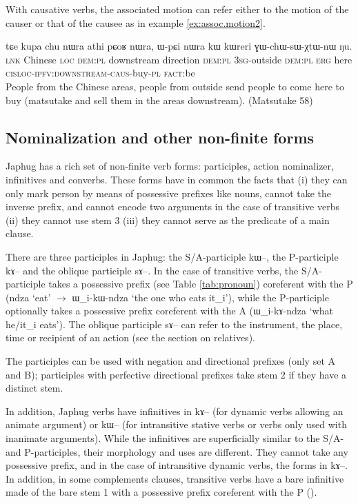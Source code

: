 \documentclass[oldfontcommands,oneside,a4paper,11pt]{article}
\newcommand{\ipa}[1]{{\phon #1}} %
\begin{document}
With causative verbs, the associated motion can refer either to the motion of the causer or that of the causee as in example \ref{ex:assoc.motion2}.

  \begin{exe}
\ex \label{ex:assoc.motion2}
\gll
\ipa{tɕe} 	\ipa{kupa} 	\ipa{chu} 	\ipa{nɯra} 	\ipa{athi} 	\ipa{pɕoʁ} 	\ipa{nɯra,} 	\ipa{ɯ-pɕi} 	\ipa{nɯra} 	\ipa{kɯ} 	\ipa{kɯreri} 	\ipa{ɣɯ-chɯ-sɯ-χtɯ-nɯ} 	\ipa{ŋu.}  \\
\textsc{lnk} Chinese \textsc{loc} \textsc{dem:pl} downstream direction \textsc{dem:pl} \textsc{3sg}-outside  \textsc{dem:pl}  \textsc{erg} here \textsc{cisloc-ipfv:downstream-caus}-buy-\textsc{pl} \textsc{fact}:be \\
\glt People from the Chinese areas, people from outside send people to come here to buy (matsutake and sell them in the areas downstream). (Matsutake 58)
  \end{exe} 


\subsection{Nominalization and other non-finite forms}

Japhug has a rich set of non-finite verb forms: participles, action nominalizer, infinitives and converbs. These forms have in common the facts that (i) they can only mark person by means of possessive prefixes like nouns, cannot take the inverse prefix, and cannot encode two arguments in the case of transitive verbs (ii) they cannot use stem 3 (iii) they cannot serve as the predicate of a main clause.

There are three participles in Japhug: the S/A-participle \ipa{kɯ--}, the P-participle \ipa{kɤ--} and the oblique participle \ipa{sɤ--}. In the case of transitive verbs, the S/A-participle takes a possessive prefix (see Table \ref{tab:pronoun}) coreferent with the P (\ipa{ndza} `eat' $\rightarrow$ \ipa{ɯ_i-kɯ-ndza} `the one who eats it_i'), while the P-participle optionally takes a possessive prefix coreferent with the A (\ipa{ɯ_i-kɤ-ndza} `what he/it_i eats'). The oblique participle \ipa{sɤ--} can refer to  the instrument, the place, time or recipient of an action (see the section on relatives).

The participles can be used with negation and directional prefixes (only set A and B); participles with perfective directional prefixes take stem 2 if they have a distinct stem.

In addition, Japhug verbs have infinitives in \ipa{kɤ--} (for dynamic verbs allowing an animate argument) or \ipa{kɯ--} (for intransitive stative verbs or verbs only used with inanimate arguments). While the infinitives are superficially similar to the S/A- and P-participles, their morphology and uses are different. They cannot take any possessive prefix, and in the case of intransitive dynamic verbs, the forms in \ipa{kɤ--}. In addition, in some complements clauses, transitive verbs have a bare infinitive made of the bare stem 1 with a possessive prefix coreferent with the P (\citealt{jacques14antipassive}).
\end{document}
